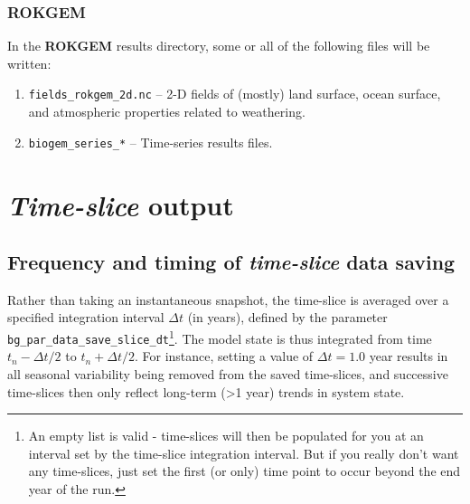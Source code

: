 \documentclass[11pt,fleqn]{book} %
\begin{document}
\subsubsection{ROKGEM}

\noindent In the \textbf{ROKGEM} results directory, some or all of the following files will be written:

\begin{enumerate}

\vspace{1mm}\item \texttt{fields\_rokgem\_2d.nc} -- 2-D fields of (mostly) land surface, ocean surface, and atmospheric properties related to weathering.

\vspace{1mm}\item \texttt{biogem\_series\_*} -- Time-series results files.

\end{enumerate}\vspace{2mm}


\newpage


\section{\textit{Time-slice} output}


\subsection{Frequency and timing of \textit{time-slice} data saving}

Rather than taking an instantaneous snapshot, the time-slice is averaged over a specified integration interval \begin{math}\Delta t\end{math} (in years), defined by the parameter \texttt{bg\_par\_data\_save\_slice\_dt}\footnote{An empty list is valid - time-slices will then be populated for you at an interval set by the time-slice integration interval. But if you really don't want any time-slices, just set the first (or only) time point to occur beyond the end year of the run.}. The model state is thus integrated from time \begin{math}t_{n} - \Delta t/2\end{math} to \begin{math}t_{n} + \Delta t/2\end{math}. For instance, setting a value of \begin{math}\Delta t = 1.0\end{math} year results in all seasonal variability being removed from the saved time-slices, and successive time-slices then only reflect long-term (\textgreater 1 year) trends in system state.
\end{document}
